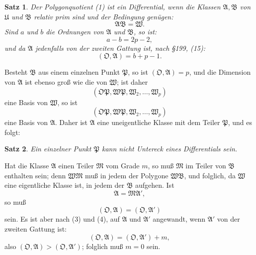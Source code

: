 \documentclass[12pt,a4paper]{article}
\newtheorem*{satz}{Satz}
\begin{document}
\begin{satz}
Der Polygonquotient (1) ist ein Differential, wenn die Klassen $\mathfrak{A}, \mathfrak{B}$ von $\mathfrak{U}$ und $\mathfrak{B}$ relativ prim sind und der Bedingung genügen:
\begin{equation}\label{eq:200-2}
\mathfrak{A}\mathfrak{B} = \mathfrak{W}.
\end{equation}
Sind $a$ und $b$ die Ordnungen von $\mathfrak{A}$ und $\mathfrak{B}$, so ist:
\begin{equation}\label{eq:200-3}
a - b = 2p - 2,
\end{equation}
und da $\mathfrak{A}$ jedenfalls von der zweiten Gattung ist, nach \S 199, (15):
\begin{equation}\label{eq:200-4}
(\mathfrak{O}, \mathfrak{A}) = b + p - 1.
\end{equation}
\end{satz}

Besteht $\mathfrak{B}$ aus einem einzelnen Punkt $\mathfrak{P}$, so ist $(\mathfrak{O}, \mathfrak{A}) = p$, und die Dimension von $\mathfrak{A}$ ist ebenso groß wie die von $\mathfrak{W}$; ist daher
\[
(\mathfrak{O}\mathfrak{P}, \mathfrak{W}\mathfrak{P}, \mathfrak{W}_2, \ldots, \mathfrak{W}_p)
\]
eine Basis von $\mathfrak{W}$, so ist
\[
(\mathfrak{O}\mathfrak{P}, \mathfrak{W}\mathfrak{P}, \mathfrak{W}_2, \ldots, \mathfrak{W}_p)
\]
eine Basis von $\mathfrak{A}$. Daher ist $\mathfrak{A}$ eine uneigentliche Klasse mit dem Teiler $\mathfrak{P}$, und es folgt:

\begin{satz}
Ein einzelner Punkt $\mathfrak{P}$ kann nicht Untereck eines Differentials sein.
\end{satz}

Hat die Klasse $\mathfrak{A}$ einen Teiler $\mathfrak{M}$ vom Grade $m$, so muß $\mathfrak{M}$ im Teiler von $\mathfrak{B}$ enthalten sein; denn $\mathfrak{W}\mathfrak{M}$ muß in jedem der Polygone $\mathfrak{W}\mathfrak{B}$, und folglich, da $\mathfrak{W}$ eine eigentliche Klasse ist, in jedem der $\mathfrak{B}$ aufgehen. Ist
\[
\mathfrak{A} = \mathfrak{M}\mathfrak{A}',
\]
so muß
\begin{equation}\label{eq:200-5}
(\mathfrak{O}, \mathfrak{A}) = (\mathfrak{O}, \mathfrak{A}')
\end{equation}
sein. Es ist aber nach (3) und (4), auf $\mathfrak{A}$ und $\mathfrak{A}'$ angewandt, wenn $\mathfrak{A}'$ von der zweiten Gattung ist:
\[
(\mathfrak{O}, \mathfrak{A}) = (\mathfrak{O}, \mathfrak{A}') + m,
\]
also $(\mathfrak{O}, \mathfrak{A}) > (\mathfrak{O}, \mathfrak{A}')$; folglich muß $m = 0$ sein.
\end{document}
